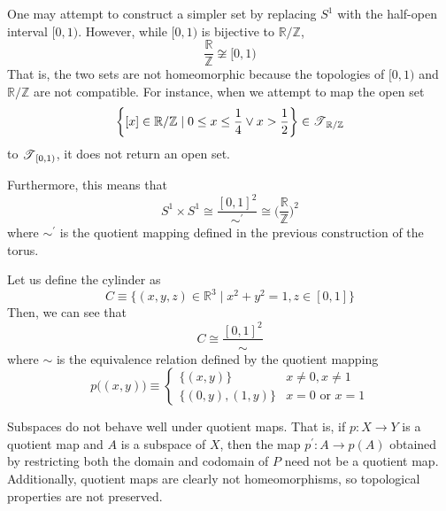 \begin{example}
    One may attempt to construct a simpler set by replacing $S^1$ with the half-open interval $[0,1)$. However, while $[0,1)$ is bijective to $\mathbb{R} / \mathbb{Z}$,
    \begin{equation}
      \frac{\mathbb{R}}{\mathbb{Z}} \not\cong [0,1)
    \end{equation}
    That is, the two sets are not homeomorphic because the topologies of $[0,1)$ and $\mathbb{R} / \mathbb{Z}$ are not compatible. For instance, when we attempt to map the open set 
    \begin{equation}
      \bigg\{ [x] \in \mathbb{R} / \mathbb{Z} \; | \; 0 \leq x \leq \frac{1}{4} \vee x > \frac{1}{2} \bigg\} \in \operatorname{\mathscr{T}}_{\mathbb{R} / \mathbb{Z}}
    \end{equation}
    to $\operatorname{\mathscr{T}}_{[0,1)}$, it does not return an open set. 

    Furthermore, this means that
    \begin{equation}
      S^1 \times S^1 \cong \frac{[0,1]^2}{\sim^\prime} \cong \bigg( \frac{\mathbb{R}}{\mathbb{Z}} \bigg)^2
    \end{equation}
    where $\sim^\prime$ is the quotient mapping defined in the previous construction of the torus. 
  \end{example}

  \begin{example}
    Let us define the cylinder as 
    \begin{equation}
      C \equiv \{(x, y, z) \in \mathbb{R}^3 \; | \; x^2 + y^2 = 1, z \in [0,1]\} 
    \end{equation}
    Then, we can see that
    \begin{equation}
      C \cong \frac{[0,1]^2}{\sim}
    \end{equation}
    where $\sim$ is the equivalence relation defined by the quotient mapping 
    \begin{equation}
      p\big((x, y)\big) \equiv \begin{cases} \{(x, y)\} & x \neq 0, x \neq 1 \\ \{(0,y), (1, y)\} & x = 0 \text{ or } x = 1 \end{cases}
    \end{equation}
  \end{example}

  Subspaces do not behave well under quotient maps. That is, if $p: X \rightarrow Y$ is a quotient map and $A$ is a subspace of $X$, then the map $p^\prime: A \rightarrow p(A)$ obtained by restricting both the domain and codomain of $P$ need not be a quotient map. Additionally, quotient maps are clearly not homeomorphisms, so topological properties are not preserved. 

